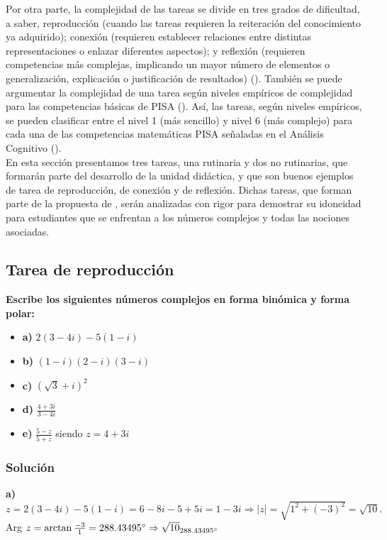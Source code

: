 \documentclass[../main.tex]{memoir}
\begin{document}
Por otra parte, la complejidad de las tareas se divide en tres grados de dificultad, a saber, reproducción (cuando las tareas requieren la reiteración del conocimiento ya adquirido); conexión (requieren establecer relaciones entre distintas representaciones o enlazar diferentes aspectos); y reflexión (requieren competencias más complejas, implicando un mayor número de elementos o generalización, explicación o justificación de resultados) (\cite{rico2016}). También se puede argumentar la complejidad de una tarea según niveles empíricos de complejidad para las competencias básicas de PISA (\cite{pisaocde}). Así, las tareas, según niveles empíricos, se pueden clasificar entre el nivel 1 (más sencillo) y nivel 6 (más complejo) para cada una de las competencias matemáticas PISA señaladas en el Análisis Cognitivo (\cite{rico2016}). \\

En esta sección presentamos tres tareas, una rutinaria y dos no rutinarias, que formarán parte del desarrollo de la unidad didáctica, y que son buenos ejemplos de tarea de reproducción, de conexión y de reflexión. Dichas tareas, que forman parte de la propuesta de \cite{sm1bach}, serán analizadas con rigor para demostrar su idoneidad para estudiantes que se enfrentan a los números complejos y todas las nociones asociadas.

\subsection{Tarea de reproducción}

\textbf{Escribe los siguientes números complejos en forma binómica y forma polar:}

\begin{itemize}
	\item \textbf{a)} $2(3-4i)-5(1-i)$
	\item \textbf{b)} $(1-i)(2-i)(3-i)$
	\item \textbf{c)} $(\sqrt{3}+i)^2$
	\item \textbf{d)} $\displaystyle \frac{4+3i}{3-4i}$
	\item \textbf{e)} $\displaystyle \frac{5-z}{5+z}$ siendo $z=4+3i$
\end{itemize}

\subsubsection{Solución}

\textbf{a)} $z =2(3-4i)-5(1-i) = 6-8i-5+5i = 1-3i \Rightarrow |z| = \sqrt{1^2+(-3)^2} = \sqrt{10}.$ Arg $z = \arctan \frac{-3}{1} = 288.43495\degree \Rightarrow \sqrt{10}_{288.43495\degree}$ \\
\end{document}
